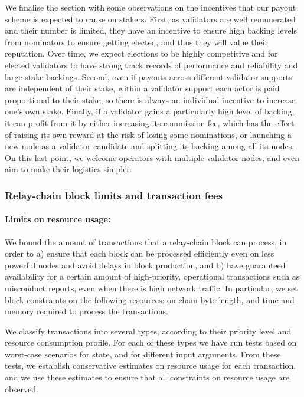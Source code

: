 We finalise the section with some observations on the incentives that our payout scheme is expected to cause on stakers. 
First, as validators are well remunerated and their number is limited, 
they have an incentive to ensure high backing levels from nominators to ensure getting elected, 
and thus they will value their reputation. Over time, we expect elections to be highly competitive 
and for elected validators to have strong track records of performance and reliability and large stake backings.
Second, even if payouts across different validator supports are independent of their stake, 
within a validator support each actor is paid proportional to their stake, 
so there is always an individual incentive to increase one's own stake. 
Finally, if a validator gains a particularly high level of backing, it can profit from it by either increasing 
its commission fee, which has the effect of raising its own reward at the risk of losing some nominations, 
or launching a new node as a validator candidate and splitting its backing among all its nodes. 
On this last point, we welcome operators with multiple validator nodes, 
and even aim to make their logistics simpler. 


\subsubsection{Relay-chain block limits and transaction fees}

\paragraph{Limits on resource usage:} We bound the amount of transactions that a relay-chain block can process, 
in order to a) ensure that each block can be processed efficiently even on less powerful nodes and avoid delays in block production, and b) have guaranteed availability for a certain amount of high-priority, operational transactions such as misconduct reports, even when there is high network traffic. 
In particular, we set block constraints on the following resources: on-chain byte-length, 
and time and memory required to process the transactions.

We classify transactions into several types, according to their priority level and resource consumption profile. 
For each of these types we have run tests based on worst-case scenarios for state, and for different input arguments. 
From these tests, we establish conservative estimates on resource usage for each transaction, and we use these estimates to ensure that all constraints on resource usage are observed.

